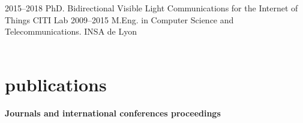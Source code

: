 \documentclass[]{cv-style}          %
\begin{document}
\begin{entrylist}
\entry
{2015--2018}
{PhD. {\normalfont Bidirectional Visible Light Communications for the Internet of Things}}
{CITI Lab}
{}
\entry
{2009--2015}
{M.Eng. {\normalfont in Computer Science and Telecommunications.}}
{INSA de Lyon}
{ \\
 \\
}
\end{entrylist}

\section{publications}
 \vspace{-0.2cm}
\large{\textbf{Journals and international conferences proceedings}}
\end{document}
